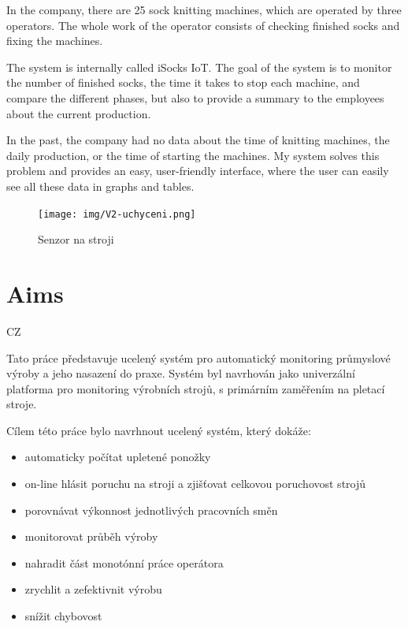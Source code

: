 \documentclass[12pt, a4paper]{article}
\begin{document}
In the company, there are 25 sock knitting machines, which are operated by three operators.
The whole work of the operator consists of checking finished socks and fixing the machines.

The system is internally called iSocks IoT.
The goal of the system is to monitor the number of finished socks, the time it takes to stop each machine, and compare the different phases, but also to provide a summary to the employees about the current production.

In the past, the company had no data about the time of knitting machines, the daily production, or the time of starting the machines.
My system solves this problem and provides an easy, user-friendly interface, where the user can easily see all these data in graphs and tables.

\newpage

\begin{figure}[t]
    \centering
    \texttt{[image: img/V2-uchyceni.png]}
    \caption{Senzor na stroji}
    \label{fig:SenzorNaStroji}
\end{figure}


\section*{Aims}
CZ

Tato práce představuje ucelený systém pro automatický monitoring průmyslové výroby a jeho nasazení do praxe.
Systém byl navrhován jako univerzální platforma pro monitoring výrobních strojů, s primárním zaměřením na pletací stroje.

Cílem této práce bylo navrhnout ucelený systém, který dokáže:

\begin{itemize}
    \item automaticky počítat upletené ponožky
    \item on-line hlásit poruchu na stroji a zjišťovat celkovou poruchovost strojů
    \item porovnávat výkonnost jednotlivých pracovních směn
    \item monitorovat průběh výroby
    \item nahradit část monotónní práce operátora
    \item zrychlit a zefektivnit výrobu
    \item snížit chybovost
\end{itemize}
\end{document}
